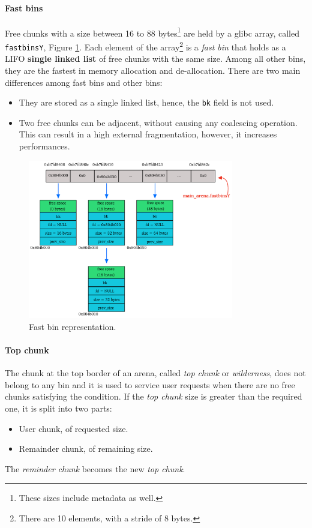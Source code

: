 \documentclass{article}
\numberwithin{equation}{subsection}
\begin{document}
\paragraph{Fast bins}
Free chunks with a size between 16 to 88 bytes\footnote{These sizes include metadata as well.} are held by a glibc array, called \texttt{fastbinsY}, Figure \ref{fig:fastbinY}. Each element of the array\footnote{There are 10 elements, with a stride of 8 bytes.} is a \emph{fast bin} that holds as a LIFO \textbf{single linked list} of free chunks with the same size. Among all other bins, they are the fastest in memory allocation and de-allocation. There are two main differences among fast bins and other bins:
\begin{itemize}
    \item They are stored as a single linked list, hence, the \texttt{bk} field is not used.
    \item Two free chunks can be adjacent, without causing any coalescing operation. This can result in a high external fragmentation, however, it increases performances.
\end{itemize}

\begin{figure}[htb]
    \centering
    \includegraphics[width=0.8\textwidth]{main_arena_fastbinY.pdf}
    \caption{Fast bin representation.}
    \label{fig:fastbinY}
\end{figure}
\paragraph{Top chunk}
The chunk at the top border of an arena, called \emph{top chunk} or \emph{wilderness}, does not belong to any bin and it is used to service user requests when there are no free chunks satisfying the condition. If the \emph{top chunk} size is greater than the required one, it is split into two parts:
\begin{itemize}
    \item User chunk, of requested size.
    \item Remainder chunk, of remaining size.
\end{itemize}
The \emph{reminder chunk} becomes the new \emph{top chunk}.
\end{document}
